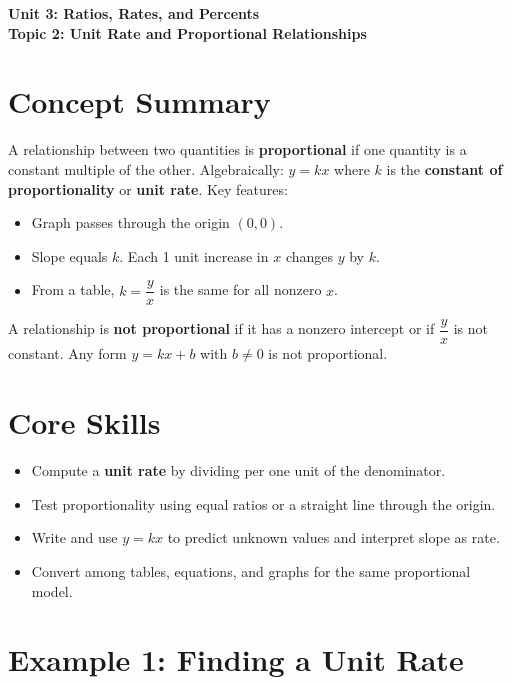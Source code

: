 \documentclass[14pt]{extarticle}
\begin{document}
\raggedright
{}

\begin{center}
    \LARGE \textbf{Unit 3: Ratios, Rates, and Percents} \\[6pt]
    \Large \textbf{Topic 2: Unit Rate and Proportional Relationships}
\end{center}

\vspace{1em}

\section*{Concept Summary}

A relationship between two quantities is \textbf{proportional} if one quantity is a constant multiple of the other.  
Algebraically: \(y = kx\) where \(k\) is the \textbf{constant of proportionality} or \textbf{unit rate}.  
Key features:
\begin{itemize}
  \item Graph passes through the origin \((0,0)\).
  \item Slope equals \(k\). Each 1 unit increase in \(x\) changes \(y\) by \(k\).
  \item From a table, \(k = \dfrac{y}{x}\) is the same for all nonzero \(x\).
\end{itemize}

A relationship is \textbf{not proportional} if it has a nonzero intercept or if \(\dfrac{y}{x}\) is not constant. Any form \(y = kx + b\) with \(b \ne 0\) is not proportional.

\section*{Core Skills}
\begin{itemize}
  \item Compute a \textbf{unit rate} by dividing per one unit of the denominator.
  \item Test proportionality using equal ratios or a straight line through the origin.
  \item Write and use \(y = kx\) to predict unknown values and interpret slope as rate.
  \item Convert among tables, equations, and graphs for the same proportional model.
\end{itemize}

\section*{Example 1: Finding a Unit Rate}
\end{document}
